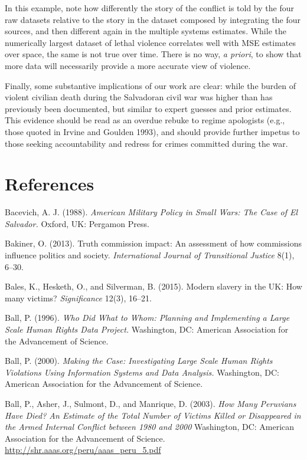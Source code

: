 \documentclass[11pt,]{article}
\begin{document}
In this example, note how differently the story of the conflict is told
by the four raw datasets relative to the story in the dataset composed
by integrating the four sources, and then different again in the
multiple systems estimates. While the numerically largest dataset of
lethal violence correlates well with MSE estimates over space, the same
is not true over time. There is no way, \emph{a priori}, to show that
more data will necessarily provide a more accurate view of violence.

Finally, some substantive implications of our work are clear: while the
burden of violent civilian death during the Salvadoran civil war was
higher than has previously been documented, but similar to expert
guesses and prior estimates. This evidence should be read as an overdue
rebuke to regime apologists (e.g., those quoted in Irvine and Goulden
1993), and should provide further impetus to those seeking
accountability and redress for crimes committed during the war.

\pagebreak
\setlength\parindent{0pt}
\singlespacing

\hypertarget{references}{%
\section{References}\label{references}}

Bacevich, A. J. (1988). \emph{American Military Policy in Small Wars:
The Case of El Salvador.} Oxford, UK: Pergamon Press.

Bakiner, O. (2013). Truth commission impact: An assessment of how
commissions influence politics and society. \emph{International Journal
of Transitional Justice} 8(1), 6--30.

Bales, K., Hesketh, O., and Silverman, B. (2015). Modern slavery in the
UK: How many victims? \emph{Significance} 12(3), 16--21.

Ball, P. (1996). \emph{Who Did What to Whom: Planning and Implementing a
Large Scale Human Rights Data Project.} Washington, DC: American
Association for the Advancement of Science.

Ball, P. (2000). \emph{Making the Case: Investigating Large Scale Human
Rights Violations Using Information Systems and Data Analysis.}
Washington, DC: American Association for the Advancement of Science.

Ball, P., Asher, J., Sulmont, D., and Manrique, D. (2003). \emph{How
Many Peruvians Have Died? An Estimate of the Total Number of Victims
Killed or Disappeared in the Armed Internal Conflict between 1980 and
2000} Washington, DC: American Association for the Advancement of
Science. \url{http://shr.aaas.org/peru/aaas_peru_5.pdf}
\end{document}
